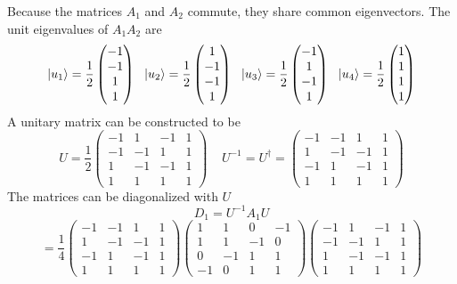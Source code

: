 \begin{sol}
Because the matrices $A_1$ and $A_2$ commute, they share common eigenvectors. The unit eigenvalues of $A_1A_2$ are
$$\ket{u_1}=\frac{1}{2}\begin{pmatrix}-1\\-1\\1\\1\end{pmatrix}\:\:\:\ket{u_2}=\frac{1}{2}\begin{pmatrix}1\\-1\\-1\\1\end{pmatrix}\:\:\:\ket{u_3}=\frac{1}{2}\begin{pmatrix}-1\\1\\-1\\1\end{pmatrix}\:\:\:\ket{u_4}=\frac{1}{2}\begin{pmatrix}1\\1\\1\\1\end{pmatrix}$$
A unitary matrix can be constructed to be
$$U=\frac{1}{2}\begin{pmatrix}-1&1&-1&1\\-1&-1&1&1\\1&-1&-1&1\\1&1&1&1\end{pmatrix}\:\:\:\:\:U^{-1}=U^\dagger=\begin{pmatrix}-1&-1&1&1\\1&-1&-1&1\\-1&1&-1&1\\1&1&1&1\end{pmatrix}$$
The matrices can be diagonalized with $U$
$$D_1=U^{-1}A_1U$$$$=\frac{1}{4}\begin{pmatrix}-1&-1&1&1\\1&-1&-1&1\\-1&1&-1&1\\1&1&1&1\end{pmatrix} \begin{pmatrix}1&1&0&-1\\1&1&-1&0\\0&-1&1&1\\-1&0&1&1\end{pmatrix}\begin{pmatrix}-1&1&-1&1\\-1&-1&1&1\\1&-1&-1&1\\1&1&1&1\end{pmatrix}
$$
\end{sol}
